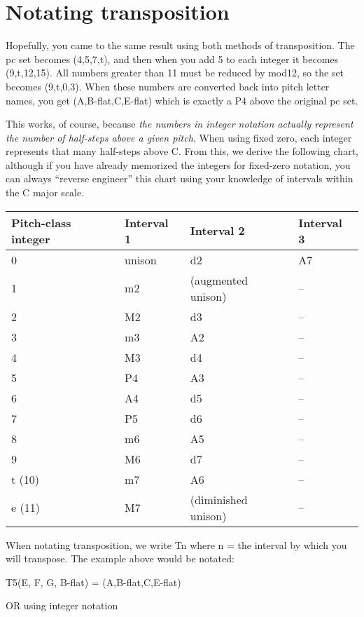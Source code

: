 \documentclass{book}
\begin{document}
\hypertarget{notating-transposition}{%
\section{Notating transposition}\label{notating-transposition}}

Hopefully, you came to the same result using both methods of transposition.
The pc set becomes (4,5,7,t), and then when you add 5 to each integer it
becomes (9,t,12,15). All numbers greater than 11 must be reduced by mod12, so
the set becomes (9,t,0,3). When these numbers are converted back into pitch
letter names, you get (A,B-flat,C,E-flat) which is exactly a P4 above the
original pc set.

This works, of course, because \emph{the numbers in integer notation actually
represent the number of half-steps above a given pitch}. When using fixed
zero, each integer represents that many half-steps above C. From this, we
derive the following chart, although if you have already memorized the
integers for fixed-zero notation, you can always ``reverse engineer'' this
chart using your knowledge of intervals within the C major scale.

\begin{longtable}[]{@{}llll@{}}
\toprule
Pitch-class integer & Interval 1 & Interval 2 & Interval 3 \\
\midrule
\endhead
0 & unison & d2 & A7 \\
1 & m2 & (augmented unison) & -- \\
2 & M2 & d3 & -- \\
3 & m3 & A2 & -- \\
4 & M3 & d4 & -- \\
5 & P4 & A3 & -- \\
6 & A4 & d5 & -- \\
7 & P5 & d6 & -- \\
8 & m6 & A5 & -- \\
9 & M6 & d7 & -- \\
t (10) & m7 & A6 & -- \\
e (11) & M7 & (diminished unison) & -- \\
\bottomrule
\end{longtable}

When notating transposition, we write Tn where n = the interval by which you
will transpose. The example above would be notated:

T5(E, F, G, B-flat) = (A,B-flat,C,E-flat)

OR using integer notation
\end{document}
